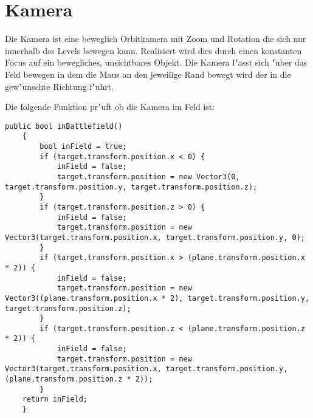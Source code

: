 \chapter{Kamera}

Die Kamera ist eine beweglich Orbitkamera mit Zoom und Rotation die sich nur innerhalb des Levels bewegen kann. Realisiert wird dies durch einen konstanten Focus auf ein bewegliches, unsichtbares Objekt. Die Kamera l"asst sich "uber das Feld bewegen in dem die Maus an den jeweilige Rand bewegt wird der in die gew"unschte Richtung f"uhrt.

Die folgende Funktion pr"uft ob die Kamera im Feld ist:

\begin{lstlisting}[brealines = true]
	public bool inBattlefield()
	{
		bool inField = true;
		if (target.transform.position.x < 0) {
			inField = false;
			target.transform.position = new Vector3(0, target.transform.position.y, target.transform.position.z);
		}
		if (target.transform.position.z > 0) {
			inField = false;
			target.transform.position = new Vector3(target.transform.position.x, target.transform.position.y, 0);
		}
		if (target.transform.position.x > (plane.transform.position.x * 2)) {
			inField = false;
			target.transform.position = new Vector3((plane.transform.position.x * 2), target.transform.position.y, target.transform.position.z);
		}
		if (target.transform.position.z < (plane.transform.position.z * 2)) {
			inField = false;
			target.transform.position = new Vector3(target.transform.position.x, target.transform.position.y, (plane.transform.position.z * 2));
		}
	return inField;
	}
\end{lstlisting}
